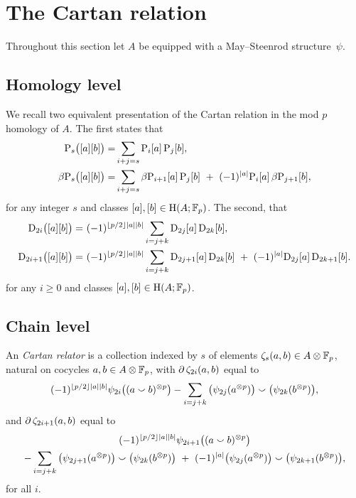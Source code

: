
\section{The Cartan relation}\label{s:cartan}

Throughout this section let $A$ be equipped with a May--Steenrod structure~$\psi$.

\subsection{Homology level}

We recall two equivalent presentation of the Cartan relation in the mod $p$ homology of $A$.
The first states that
\begin{align*}
	\mathrm{P}_s\big([a][b]\big) =&
	\sum_{i+j=s} \mathrm{P}_i[a] \, \mathrm{P}_j[b], \\
	\beta\mathrm{P}_s\big([a][b]\big) =&
	\sum_{i+j=s} \beta\mathrm{P}_{i+1}[a] \, \mathrm{P}_j[b] \ +\ (-1)^{\lvert a\rvert} \mathrm{P}_i[a] \, \beta\mathrm{P}_{j+1}[b],
\end{align*}
for any integer $s$ and classes $[a],[b] \in \mathrm{H}(A;{\mathbb{F}_p})$.
The second, that
\begin{align*}
	\mathrm{D}_{2i}\big([a][b]\big) =\ &
	(-1)^{\lfloor p/2\rfloor\lvert a\rvert\lvert b\rvert} \sum_{i=j+k} \mathrm{D}_{2j}[a] \, \mathrm{D}_{2k}[b], \\
	\mathrm{D}_{2i+1}\big([a][b]\big) =\ &
	(-1)^{\lfloor p/2\rfloor\lvert a\rvert\lvert b\rvert} \sum_{i=j+k} \mathrm{D}_{2j+1}[a] \, \mathrm{D}_{2k}[b] \ +\ (-1)^{\lvert a\rvert}\mathrm{D}_{2j}[a] \, \mathrm{D}_{2k+1}[b].
\end{align*}
for any $i \geq 0$ and classes $[a],[b] \in \mathrm{H}(A;{\mathbb{F}_p})$.

\subsection{Chain level}

An \textit{Cartan relator} is a collection indexed by $s$ of elements $\zeta_{s}(a,b) \in A \otimes {\mathbb{F}_p}$, natural on cocycles $a,b \in A \otimes {\mathbb{F}_p}$, with $\operatorname{\partial}\zeta_{2i}(a,b)$ equal to
\begin{align*}
	(-1)^{\lfloor p/2\rfloor\lvert a\rvert\lvert b\rvert} \psi_{2i}\big((a \smallsmile b)^{\otimes p}\big) -
	\sum_{i=j+k}\big(\psi_{2j}(a^{\otimes p})\big) \smallsmile \big(\psi_{2k}(b^{\otimes p})\big),
\end{align*}
and $\operatorname{\partial} \zeta_{2i+1}(a,b)$ equal to
\begin{multline*}
	(-1)^{\lfloor p/2\rfloor\lvert a\rvert\lvert b\rvert} \psi_{2i+1}\big((a \smallsmile b)^{\otimes p}\big)\\ -
	\sum_{i=j+k} \big(\psi_{2j+1}(a^{\otimes p})\big) \smallsmile \big(\psi_{2k}(b^{\otimes p})\big)\ +\
	(-1)^{\lvert a\rvert}\big(\psi_{2j}(a^{\otimes p})\big) \smallsmile \big(\psi_{2k+1}(b^{\otimes p})\big),
\end{multline*}
for all $i$.

